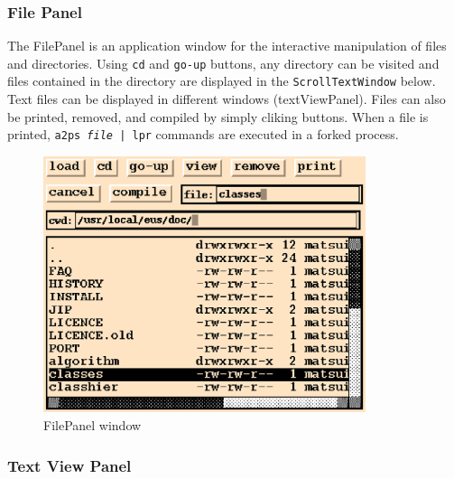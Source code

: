 \begin{refdesc}

\end{refdesc}

\subsubsection{File Panel}
The FilePanel is an application window for the interactive  manipulation
of files and directories.
Using {\tt cd} and {\tt go-up} buttons, any directory can be visited
and files contained in the directory are displayed in the {\tt ScrollTextWindow}
below.
Text files can be displayed in different windows (textViewPanel).
Files can also be printed, removed, and compiled by simply cliking buttons.
When a file is printed, {\tt a2ps {\em file} | lpr} commands are executed
in a forked process.

\begin{figure}
\begin{center}
\includegraphics[height=7.5cm]{fig/filepanel.ps}
\end{center}
\caption{FilePanel window}
\end{figure}

\subsubsection{Text View Panel}

